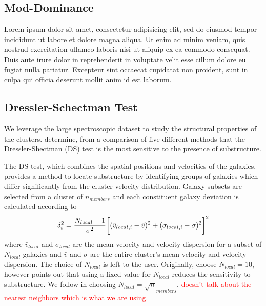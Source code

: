 \documentclass[apj, revtex4]{emulateapj}
\newcommand{\editorial}[1]{\textcolor{red}{#1} }
\begin{document}
\subsection{Mod-Dominance}
Lorem ipsum dolor sit amet, consectetur adipisicing elit, sed do eiusmod tempor incididunt ut labore et dolore magna aliqua. Ut enim ad minim veniam, quis nostrud exercitation ullamco laboris nisi ut aliquip ex ea commodo consequat. Duis aute irure dolor in reprehenderit in voluptate velit esse cillum dolore eu fugiat nulla pariatur. Excepteur sint occaecat cupidatat non proident, sunt in culpa qui officia deserunt mollit anim id est laborum.
\subsection{Dressler-Schectman Test}
We leverage the large spectroscopic dataset to study the structural properties of the clusters. \cite{Pinkney1996} determine, from a comparison of five different methods that the Dressler-Shectman (DS) test \citep{Dressler1988} is the most sensitive to the presence of substructure.

The DS test, which combines the spatial positions and velocities of the galaxies, provides a method to locate substructure by identifying groups of galaxies which differ significantly from the cluster velocity distribution. Galaxy subsets are selected from a cluster of $n_{members}$ and each constituent galaxy deviation is calculated according to
\begin{equation}
	\delta_i^2 = \frac{N_{local}+1}{\sigma^2}\bigg{[}(\bar{v}_{local,i} - \bar{v})^2 + (\sigma_{local,i} - \sigma)^2\bigg{]}^2
\end{equation}
where $\bar{v}_{local}$ and $\sigma_{local}$ are the mean velocity and velocity dispersion for a subset of $N_{local}$ galaxies and $\bar{v}$ and $\sigma$ are the entire cluster's mean velocity and velocity dispersion. The choice of $N_{local}$ is left to the user. Originally, \cite{Dressler1988} choose $N_{local}=10$, however \cite{Bird1994} points out that using a fixed value for $N_{local}$ reduces the sensitivity to substructure. We follow \cite{Bird1994} in choosing $N_{local} = \sqrt n_{members}$. \editorial{doesn't talk about the nearest neighbors which is what we are using.}
\end{document}
